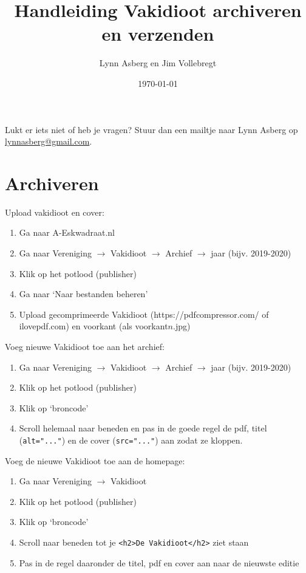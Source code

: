 \documentclass{article}
\title{Handleiding Vakidioot archiveren en verzenden}
\author{Lynn Asberg en Jim Vollebregt}
\date{\today}
\begin{document}
\maketitle

\begin{center}
    Lukt er iets niet of heb je vragen? Stuur dan een mailtje naar Lynn Asberg op \href{mailto:lynnasberg@gmail.com}{lynnasberg@gmail.com}.
\end{center}


\section{Archiveren}

Upload vakidioot en cover:

\begin{enumerate}
    \item Ga naar A-Eskwadraat.nl
    \item Ga naar Vereniging $\to$ Vakidioot $\to$ Archief $\to$ jaar (bijv. 2019-2020)
    \item Klik op het potlood (publisher)
    \item Ga naar `Naar bestanden beheren'
    \item Upload gecomprimeerde Vakidioot (https://pdfcompressor.com/ of ilovepdf.com) en voorkant (als voorkant$n$.jpg)
\end{enumerate}

\noindent Voeg nieuwe Vakidioot toe aan het archief:
\begin{enumerate}
    \item Ga naar Vereniging $\to$ Vakidioot $\to$ Archief $\to$ jaar (bijv. 2019-2020)
    \item Klik op het potlood (publisher)
    \item Klik op `broncode'
    \item Scroll helemaal naar beneden en pas in de goede regel de pdf, titel (\texttt{alt="..."}) en de cover (\texttt{src="..."}) aan zodat ze kloppen.
\end{enumerate}

\noindent Voeg de nieuwe Vakidioot toe aan de homepage:
\begin{enumerate}
    \item Ga naar Vereniging $\to$ Vakidioot
    \item Klik op het potlood (publisher)
    \item Klik op `broncode'
    \item Scroll naar beneden tot je \texttt{<h2>De Vakidioot</h2>} ziet staan
    \item Pas in de regel daaronder de titel, pdf en cover aan naar de nieuwste editie
\end{enumerate}
\end{document}
